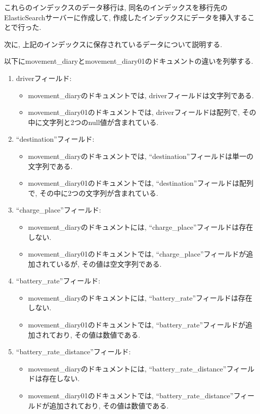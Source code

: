 これらのインデックスのデータ移行は, 同名のインデックスを移行先のElasticSearchサーバーに作成して, 作成したインデックスにデータを挿入することで行った.

次に, 上記のインデックスに保存されているデータについて説明する.

以下にmovement\_diaryとmovement\_diary01のドキュメントの違いを列挙する.

\begin{enumerate}
    \item driverフィールド:
          \begin{itemize}
              \item movement\_diaryのドキュメントでは, driverフィールドは文字列である.
              \item movement\_diary01のドキュメントでは, driverフィールドは配列で, その中に文字列と2つのnull値が含まれている.
          \end{itemize}
          
    \item ``destination''フィールド:
          \begin{itemize}
              \item movement\_diaryのドキュメントでは, ``destination''フィールドは単一の文字列である.
              \item movement\_diary01のドキュメントでは, ``destination''フィールドは配列で, その中に2つの文字列が含まれている.
          \end{itemize}
          
    \item ``charge\_place''フィールド:
          \begin{itemize}
              \item movement\_diaryのドキュメントには, ``charge\_place''フィールドは存在しない.
              \item movement\_diary01のドキュメントでは, ``charge\_place''フィールドが追加されているが, その値は空文字列である.
          \end{itemize}
          
    \item ``battery\_rate''フィールド:
          \begin{itemize}
              \item movement\_diaryのドキュメントには, ``battery\_rate''フィールドは存在しない.
              \item movement\_diary01のドキュメントでは, ``battery\_rate''フィールドが追加されており, その値は数値である.
          \end{itemize}
          
    \item ``battery\_rate\_distance''フィールド:
          \begin{itemize}
              \item movement\_diaryのドキュメントには, ``battery\_rate\_distance''フィールドは存在しない.
              \item movement\_diary01のドキュメントでは, ``battery\_rate\_distance''フィールドが追加されており, その値は数値である.
          \end{itemize}
\end{enumerate}

